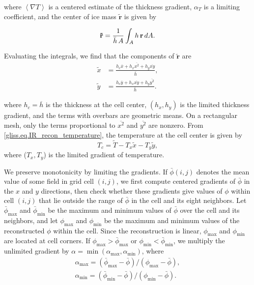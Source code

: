 \noindent
where $\left<\nabla T\right>$ is a centered estimate of the thickness
gradient, $\alpha_T$ is a limiting coefficient, and the center of ice mass
$\mathbf{\tilde{r}}$ is given by

\begin{equation}
{\bf \tilde{r}} = \frac{1}{\bar h \, A} \int_A h \, {\bf r} \, dA.
\end{equation}

\noindent
Evaluating the integrals, we find that the components of $\mathbf{\tilde{r}}$ are
\begin{equation}
  \begin{split}
    \tilde{x} & = \frac{h_c \overline{x} + h_x \overline{x^2} + h_y \overline{xy}} {\bar{h}}, \\
    \tilde{y} & = \frac{h_c \overline{y} + h_x \overline{xy} + h_y \overline{y^2}} {\bar{h}}.
  \end{split}
\end{equation}

\noindent
where $h_c = \overline{h}$ is the thickness at the cell center,
$(h_x,h_y)$ is the limited thickness gradient, and the terms with overbars are geometric
means.  On a rectangular mesh, only the terms proportional to $\overline{x^2}$ and $\overline{y^2}$
are nonzero.
From \eqref{gliss.eq.IR_recon_temperature}, the temperature at the cell center is given by
\[ T_c = \tilde{T} - T_x \tilde{x} - T_y \tilde{y}, \]
where ($T_x, T_y$) is the limited gradient of temperature.

We preserve monotonicity by limiting the gradients. If
$\bar{\phi}(i,j)$ denotes the mean value of some field in grid cell
$(i,j)$, we first compute centered gradients of $\bar{\phi}$ in
the $x$ and $y$ directions, then check whether these gradients
give values of $\phi$ within cell $(i,j)$ that lie outside the
range of $\bar{\phi}$ in the cell and its eight neighbors.  Let
$\bar{\phi}_{\max}$ and $\bar{\phi}_{\min}$ be the maximum and
minimum values of $\bar{\phi}$ over the cell and its neighbors,
and let $\phi_{\max}$ and $\phi_{\min}$ be the maximum and minimum
values of the reconstructed $\phi$ within the cell.  Since the
reconstruction is linear, $\phi_{\max}$ and $\phi_{\min}$ are
located at cell corners.  If $\phi_{\max} > \bar{\phi}_{\max}$ or
$ \phi_{\min} < \bar{\phi}_{\min}$, we multiply the unlimited
gradient by $\alpha = \min(\alpha_{\max}, \alpha_{\min})$, where
\begin{equation}
  \label{gliss.eq.IR_limited_gradient}
  \begin{split}
    \alpha_{\max} = (\bar{\phi}_{\max} - \bar{\phi}) / (\phi_{\max} -\bar{\phi}), \\
    \alpha_{\min} = (\bar{\phi}_{\min} - \bar{\phi}) / (\phi_{\min} -\bar{\phi}).
  \end{split}
\end{equation}

